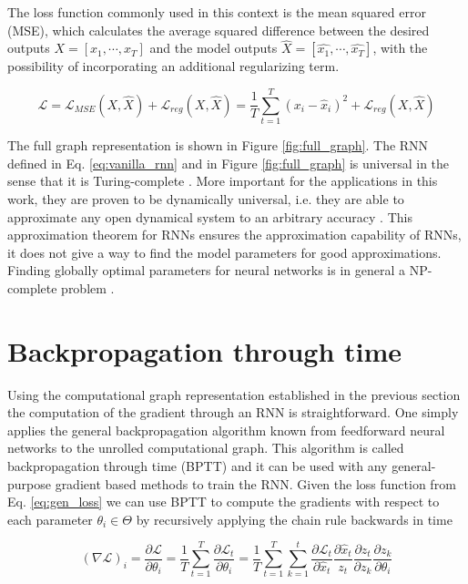 The loss function commonly used in this context is the mean squared error (MSE), which calculates the average squared difference between the
desired outputs $X=[x_1, \cdots, x_T]$  and the model outputs $\hat{X}=[\hat{x_1}, \cdots, \hat{x_T} ]$, with the possibility of 
incorporating an additional regularizing term.

\begin{equation}
    \mathcal{L} = \mathcal{L}_{MSE}(X, \hat{X}) + \mathcal{L}_{reg}(X, \hat{X}) = \frac{1}{T} \sum_{t=1}^{T}(x_i - \hat{x}_i)^2 + \mathcal{L}_{reg}(X, \hat{X})
    \label{eq:gen_loss}
\end{equation}



The full graph representation is shown in Figure \ref{fig:full_graph}. The RNN defined in Eq. \ref{eq:vanilla_rnn} and in Figure \ref{fig:full_graph} is universal in
the sense that it is Turing-complete \cite{chung2021turing}. More important for the applications in this work, they are proven to be dynamically universal, i.e. they are 
able to approximate any open dynamical system to an arbitrary accuracy \cite{schafer2006recurrent}. This approximation theorem for RNNs ensures the approximation capability
of RNNs, it does not give a way to find the model parameters for good approximations. Finding globally optimal parameters for neural networks is in general a 
NP-complete problem \cite{blum1988training}.


\section{Backpropagation through time}
Using the computational graph representation established in the previous section the computation of the gradient through an RNN is straightforward. One simply applies the 
general backpropagation algorithm known from feedforward neural networks to the unrolled computational graph. This algorithm is called backpropagation through time (BPTT)
and it can be used with any general-purpose gradient based methods to train the RNN.
Given the loss function from Eq. \ref{eq:gen_loss} we can use BPTT to compute the gradients with respect to each parameter $\theta_i \in \Theta$ by recursively applying the chain
rule backwards in time

\begin{equation}
    (\nabla \mathcal{L})_i = \frac{\partial \mathcal{L}}{\partial \theta_{i}} = \frac{1}{T} \sum_{t=1}^{T} \frac{\partial \mathcal{L}_{t}}{\partial \theta_{i}}
    = \frac{1}{T} \sum_{t=1}^{T} \sum_{k=1}^{t} \frac{\partial \mathcal{L}_{t}}{\partial \hat{x}_{t}} \frac{\partial \hat{x}_{t}}{z_{t}} \frac{\partial z_{t}}{\partial z_{k}} \frac{\partial z_{k}}{\partial \theta_{i}}
    \label{eq:bptt_grad}
\end{equation}

